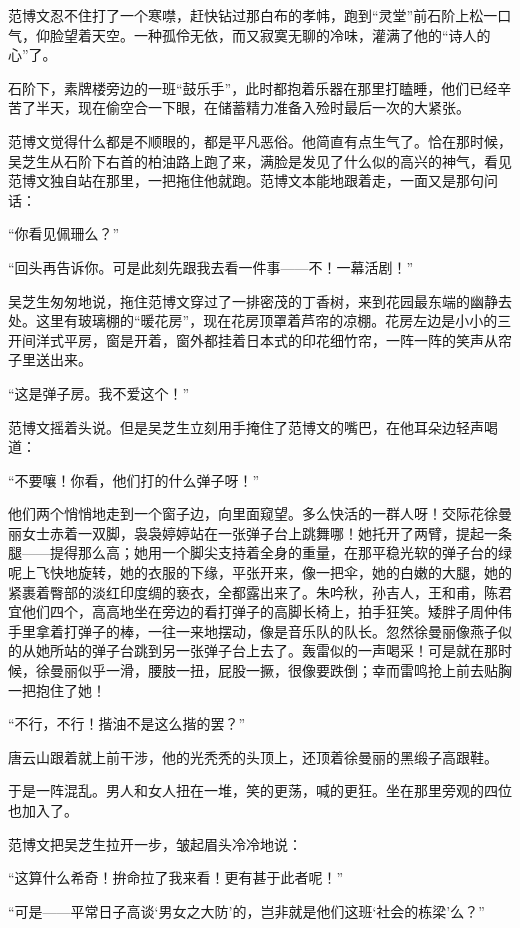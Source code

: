 \par 范博文忍不住打了一个寒噤，赶快钻过那白布的孝帏，跑到“灵堂”前石阶上松一口气，仰脸望着天空。一种孤伶无依，而又寂寞无聊的冷味，灌满了他的“诗人的心”了。
\par 石阶下，素牌楼旁边的一班“鼓乐手”，此时都抱着乐器在那里打瞌睡，他们已经辛苦了半天，现在偷空合一下眼，在储蓄精力准备入殓时最后一次的大紧张。
\par 范博文觉得什么都是不顺眼的，都是平凡恶俗。他简直有点生气了。恰在那时候，吴芝生从石阶下右首的柏油路上跑了来，满脸是发见了什么似的高兴的神气，看见范博文独自站在那里，一把拖住他就跑。范博文本能地跟着走，一面又是那句问话：
\par “你看见佩珊么？”
\par “回头再告诉你。可是此刻先跟我去看一件事——不！一幕活剧！”
\par 吴芝生匆匆地说，拖住范博文穿过了一排密茂的丁香树，来到花园最东端的幽静去处。这里有玻璃棚的“暖花房”，现在花房顶罩着芦帘的凉棚。花房左边是小小的三开间洋式平房，窗是开着，窗外都挂着日本式的印花细竹帘，一阵一阵的笑声从帘子里送出来。
\par “这是弹子房。我不爱这个！”
\par 范博文摇着头说。但是吴芝生立刻用手掩住了范博文的嘴巴，在他耳朵边轻声喝道：
\par “不要嚷！你看，他们打的什么弹子呀！”
\par 他们两个悄悄地走到一个窗子边，向里面窥望。多么快活的一群人呀！交际花徐曼丽女士赤着一双脚，袅袅婷婷站在一张弹子台上跳舞哪！她托开了两臂，提起一条腿——提得那么高；她用一个脚尖支持着全身的重量，在那平稳光软的弹子台的绿呢上飞快地旋转，她的衣服的下缘，平张开来，像一把伞，她的白嫩的大腿，她的紧裹着臀部的淡红印度绸的亵衣，全都露出来了。朱吟秋，孙吉人，王和甫，陈君宜他们四个，高高地坐在旁边的看打弹子的高脚长椅上，拍手狂笑。矮胖子周仲伟手里拿着打弹子的棒，一往一来地摆动，像是音乐队的队长。忽然徐曼丽像燕子似的从她所站的弹子台跳到另一张弹子台上去了。轰雷似的一声喝采！可是就在那时候，徐曼丽似乎一滑，腰肢一扭，屁股一撅，很像要跌倒；幸而雷鸣抢上前去贴胸一把抱住了她！
\par “不行，不行！揩油不是这么揩的罢？”
\par 唐云山跟着就上前干涉，他的光秃秃的头顶上，还顶着徐曼丽的黑缎子高跟鞋。
\par 于是一阵混乱。男人和女人扭在一堆，笑的更荡，喊的更狂。坐在那里旁观的四位也加入了。
\par 范博文把吴芝生拉开一步，皱起眉头冷冷地说：
\par “这算什么希奇！拚命拉了我来看！更有甚于此者呢！”
\par “可是——平常日子高谈‘男女之大防’的，岂非就是他们这班‘社会的栋梁’么？”

